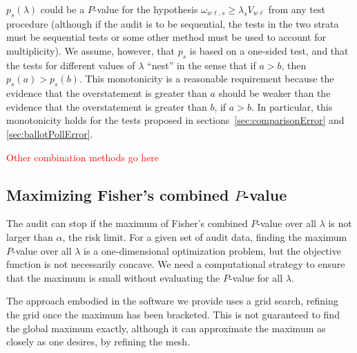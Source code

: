 \documentclass[runningheads]{llncs}
\newcommand{\comment}[1]{\textcolor{red}{\sc #1}}
\begin{document}
$p_s(\lambda)$ could be a $P$-value for the hypothesis
$\omega_{w\ell,s} \ge \lambda_s V_{w\ell}$ from any test procedure (although
if the audit is to be sequential, the tests in the two strata must be sequential tests or
some other method must be used to account for multiplicity). 
We assume, however, that $p_s$ is based on a one-sided test, and that the tests
for different values of $\lambda$ ``nest'' in the sense that if $a > b$,
then $p_s(a) > p_s(b)$.
This monotonicity is a reasonable requirement because the evidence that the overstatement
is greater than $a$ should be weaker than the evidence that the overstatement is greater than
$b$, if $a > b$.
In particular, this monotonicity holds for the tests proposed in sections~\ref{sec:comparisonError}
and \ref{sec:ballotPollError}.


\comment{Other combination methods go here}

\subsection{Maximizing Fisher's combined $P$-value}
The audit can stop if the maximum of Fisher's combined $P$-value over all
$\lambda$ is not larger than $\alpha$, the risk limit.
For a given set of audit data, 
finding the maximum $P$-value over all $\lambda$
is a one-dimensional optimization problem, but the objective function is not necessarily concave.
We need a computational strategy to ensure that the maximum is small
without evaluating the $P$-value for all $\lambda$.

The approach embodied in the software we provide uses a grid search, refining the
grid once the maximum has been bracketed.
This is not guaranteed to find the global maximum exactly, although it can approximate 
the maximum as closely as one desires, by refining the mesh.
\end{document}
